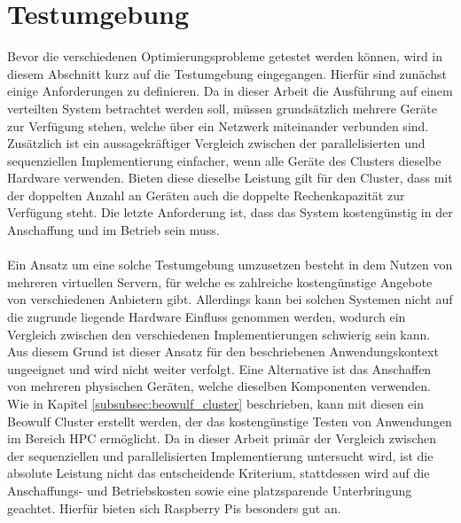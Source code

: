 \section{Testumgebung}
\label{sec:analysis_testsetup}
Bevor die verschiedenen Optimierungsprobleme getestet werden können, wird in diesem Abschnitt kurz auf die Testumgebung eingegangen. Hierfür sind zunächst einige Anforderungen zu definieren. Da in dieser Arbeit die Ausführung auf einem verteilten System betrachtet werden soll, müssen grundsätzlich mehrere Geräte zur Verfügung stehen, welche über ein Netzwerk miteinander verbunden sind. Zusätzlich ist ein aussagekräftiger Vergleich zwischen der parallelisierten und sequenziellen Implementierung einfacher, wenn alle Geräte des Clusters dieselbe Hardware verwenden. Bieten diese dieselbe Leistung gilt für den Cluster, dass mit der doppelten Anzahl an Geräten auch die doppelte Rechenkapazität zur Verfügung steht. Die letzte Anforderung ist, dass das System kostengünstig in der Anschaffung und im Betrieb sein muss. 
\\\\
Ein Ansatz um eine solche Testumgebung umzusetzen besteht in dem Nutzen von mehreren virtuellen Servern, für welche es zahlreiche kostengünstige Angebote von verschiedenen Anbietern gibt. Allerdings kann bei solchen Systemen nicht auf die zugrunde liegende Hardware Einfluss genommen werden, wodurch ein Vergleich zwischen den verschiedenen Implementierungen schwierig sein kann. Aus diesem Grund ist dieser Ansatz für den beschriebenen Anwendungskontext ungeeignet und wird nicht weiter verfolgt. Eine Alternative ist das Anschaffen von mehreren physischen Geräten, welche dieselben Komponenten verwenden. Wie in Kapitel \ref{subsubsec:beowulf_cluster} beschrieben, kann mit diesen ein Beowulf Cluster erstellt werden, der das kostengünstige Testen von Anwendungen im Bereich \ac{HPC} ermöglicht. Da in dieser Arbeit primär der Vergleich zwischen der sequenziellen und parallelisierten Implementierung untersucht wird, ist die absolute Leistung nicht das entscheidende Kriterium, stattdessen wird auf die Anschaffungs- und Betriebskosten sowie eine platzsparende Unterbringung geachtet. Hierfür bieten sich Raspberry Pis besonders gut an.  
\\\\
